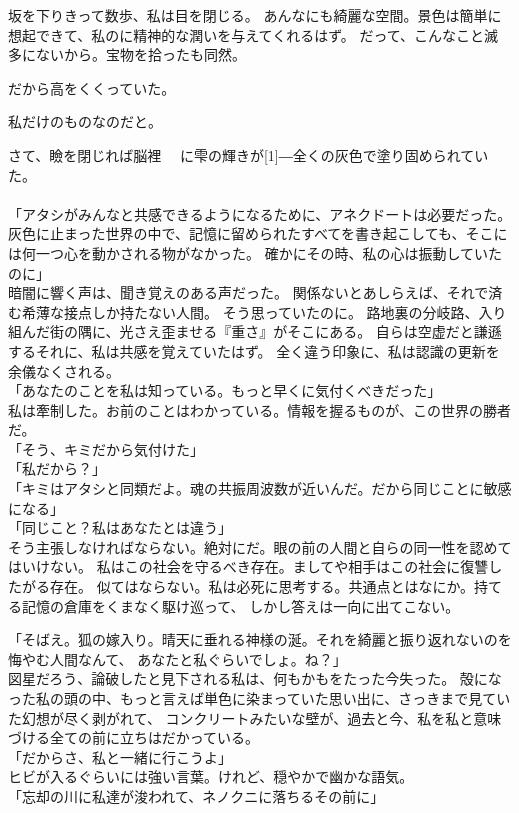 \documentclass[../NenokuniMain]{subfiles}
\begin{document}
坂を下りきって数歩、私は目を閉じる。
あんなにも綺麗な空間。景色は簡単に想起できて、私のに精神的な潤いを与えてくれるはず。
だって、こんなこと滅多にないから。宝物を拾ったも同然。

だから高をくくっていた。

私だけのものなのだと。

さて、瞼を閉じれば脳裡 　に雫の輝きが\scalebox{2}[1]{―}全くの灰色で塗り固められていた。\\

{\LARGE \hspace{50pt}}\\

「アタシがみんなと共感できるようになるために、アネクドートは必要だった。
灰色に止まった世界の中で、記憶に留められたすべてを書き起こしても、そこには何一つ心を動かされる物がなかった。
確かにその時、私の心は振動していたのに」\\
暗闇に響く声は、聞き覚えのある声だった。
関係ないとあしらえば、それで済む希薄な接点しか持たない人間。
そう思っていたのに。
路地裏の分岐路、入り組んだ街の隅に、光さえ歪ませる『重さ』がそこにある。
自らは空虚だと謙遜するそれに、私は共感を覚えていたはず。
全く違う印象に、私は認識の更新を余儀なくされる。\\
「あなたのことを私は知っている。もっと早くに気付くべきだった」\\
私は牽制した。お前のことはわかっている。情報を握るものが、この世界の勝者だ。\\
「そう、キミだから気付けた」\\
「私だから？」\\
「キミはアタシと同類だよ。魂の共振周波数が近いんだ。だから同じことに敏感になる」\\
「同じこと？私はあなたとは違う」\\
そう主張しなければならない。絶対にだ。眼の前の人間と自らの同一性を認めてはいけない。
私はこの社会を守るべき存在。ましてや相手はこの社会に復讐したがる存在。
似てはならない。私は必死に思考する。共通点とはなにか。持てる記憶の倉庫をくまなく駆け巡って、
しかし答えは一向に出てこない。

「そばえ。狐の嫁入り。晴天に垂れる神様の涎。それを綺麗と振り返れないのを悔やむ人間なんて、
あなたと私ぐらいでしょ。ね？」\\
図星だろう、論破したと見下される私は、何もかもをたった今失った。
殻になった私の頭の中、もっと言えば単色に染まっていた思い出に、さっきまで見ていた幻想が尽く剥がれて、
コンクリートみたいな壁が、過去と今、私を私と意味づける全ての前に立ちはだかっている。\\
「だからさ、私と一緒に行こうよ」\\
ヒビが入るぐらいには強い言葉。けれど、穏やかで幽かな語気。\\
「忘却の川に私達が浚われて、ネノクニに落ちるその前に」
\end{document}
